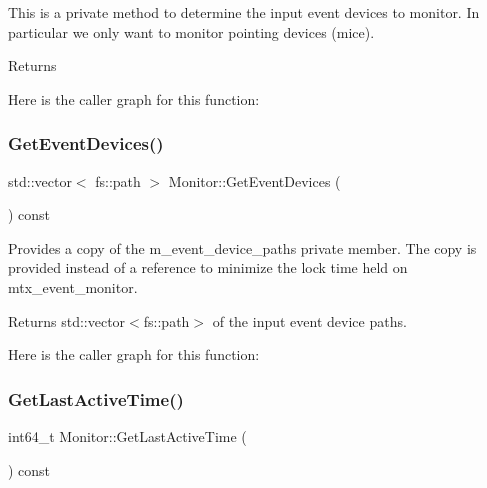 This is a private method to determine the input event devices to monitor. In particular we only want to monitor pointing devices (mice). 

\begin{DoxyReturn}{Returns}

\end{DoxyReturn}
Here is the caller graph for this function\+:
\mbox{\label{classEventDetect_1_1Monitor_ae8da256174cfe6eab25421dc1d2673d7}} 
\subsubsection{\texorpdfstring{Get\+Event\+Devices()}{GetEventDevices()}}
{\footnotesize\ttfamily std\+::vector$<$ fs\+::path $>$ Monitor\+::\+Get\+Event\+Devices (\begin{DoxyParamCaption}{ }\end{DoxyParamCaption}) const}



Provides a copy of the m\+\_\+event\+\_\+device\+\_\+paths private member. The copy is provided instead of a reference to minimize the lock time held on mtx\+\_\+event\+\_\+monitor. 

\begin{DoxyReturn}{Returns}
std\+::vector$<$fs\+::path$>$ of the input event device paths. 
\end{DoxyReturn}
Here is the caller graph for this function\+:
\mbox{\label{classEventDetect_1_1Monitor_a8abba216129439752a569239173fea87}} 
\subsubsection{\texorpdfstring{Get\+Last\+Active\+Time()}{GetLastActiveTime()}}
{\footnotesize\ttfamily int64\+\_\+t Monitor\+::\+Get\+Last\+Active\+Time (\begin{DoxyParamCaption}{ }\end{DoxyParamCaption}) const}




